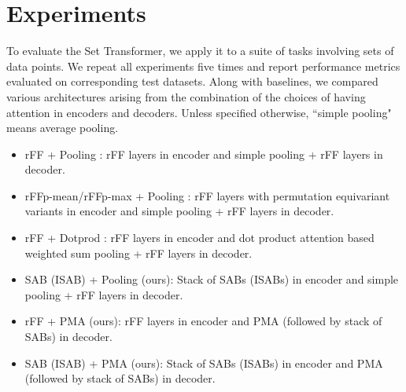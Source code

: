 \section{Experiments}
\label{sec:experiments}

To evaluate the Set Transformer, we apply it to a suite of tasks involving sets of data points.
We repeat all experiments five times and report performance metrics evaluated on corresponding test datasets.
Along with baselines, we compared various architectures arising from the combination of the choices of having attention in encoders and decoders. %
Unless specified otherwise, ``simple pooling" means average pooling.
\begin{itemize}
\setlength\itemsep{-0.4em}
\item rFF + Pooling \citep{Zaheer2017}: rFF layers in encoder and simple pooling + rFF layers in decoder.
\item rFFp-mean/rFFp-max + Pooling \citep{Zaheer2017}: rFF layers with permutation equivariant variants in encoder \citep[\eqref{eq:multihead1}]{Zaheer2017} and simple pooling + rFF layers in decoder.
\item rFF + Dotprod \citep{Yang2018,Ilse2018}: rFF layers in encoder and dot product attention based weighted sum pooling + rFF layers in decoder.
\item SAB (ISAB) + Pooling (ours):  Stack of SABs (ISABs) in encoder and simple pooling + rFF layers in decoder.
\item rFF + PMA (ours): rFF layers in encoder and PMA (followed by stack of SABs) in decoder.
\item SAB (ISAB) + PMA (ours): Stack of SABs (ISABs) in encoder and PMA (followed by stack of SABs) in decoder.
\end{itemize}

